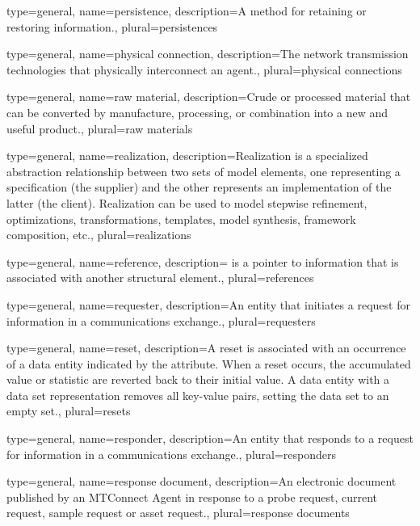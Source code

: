 {
	type={general},
    name={persistence},
	description={A method for retaining or restoring information.},
	plural={persistences}
}

{
	type={general},
    name={physical connection},
	description={The network transmission technologies that physically interconnect an \gls{agent}.},
	plural={physical connections}
}

{
	type={general},
    name={raw material},
	description={Crude or processed material that can be converted by manufacture, processing, or combination into a new and useful product.},
	plural={raw materials}
}

{
	type={general},
    name={realization},
	description={Realization is a specialized abstraction relationship between two sets of model elements, one representing a specification (the supplier) and the other represents an implementation of the latter (the client). Realization can be used to model stepwise refinement, optimizations, transformations, templates, model synthesis, framework composition, etc.},
	plural={realizations}
}

{
	type={general},
    name={reference},
	description={ is a pointer to information that is associated with another \gls{structural element}.},
	plural={references}
}

{
	type={general},
    name={requester},
	description={An entity that initiates a \gls{request} for information in a communications exchange.},
	plural={requesters}
}

{
	type={general},
    name={reset},
	description={A reset is associated with an occurrence of a \gls{data entity} indicated by the  attribute. When a reset occurs, the accumulated value or statistic are reverted back to their initial value. A \gls{data entity} with a \gls{data set} representation removes all \glspl{key-value pair}, setting the \gls{data set} to an empty set.},
	plural={resets}
}

{
	type={general},
    name={responder},
	description={An entity that responds to a \gls{request} for information in a communications exchange.},
	plural={responders}
}

{
	type={general},
    name={response document},
	description={An electronic document published by an \gls{MTConnect Agent} in response to a \gls{probe request}, \gls{current request}, \gls{sample request} or \gls{asset request}.},
	plural={response documents}
}

